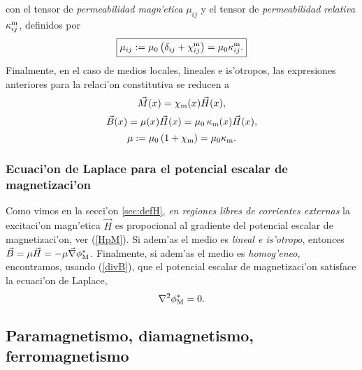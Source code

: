 con el tensor de \textit{permeabilidad magn'etica} $\mu_{ij}$ y el
tensor de \textit{permeabilidad relativa} $\kappa^{\rm m}_{ij}$, definidos por
\begin{equation}
 \boxed{\mu_{ij}:=\mu_0\left(\delta_{ij}+\chi^{\rm
m}_{ij}\right)=\mu_0\kappa^{\rm m}_{ij}.}
\end{equation}
Finalmente, en el caso de medios locales, lineales e is'otropos, las
expresiones anteriores para la relaci'on constitutiva se reducen a
\begin{equation}
 \vec{M}(x)=\chi_{\rm m}(x)\vec{H}(x),
\end{equation}
\begin{equation}
 \vec{B}(x)=\mu(x)\vec{H}(x)=\mu_0\,\kappa_{\rm m}(x)\vec{H}(x),
\end{equation}
\begin{equation}
 \mu:=\mu_0\left(1+\chi_{\rm m}\right)=\mu_0\kappa_{\rm m}.
\end{equation}


\subsubsection{Ecuaci'on de Laplace para el potencial escalar de magnetizaci'on}
Como vimos en la secci'on \ref{sec:defH}, \textit{en regiones libres de corrientes externas} la excitaci'on magn'etica $\vec{H}$ es propocional al gradiente del potencial escalar de magnetizaci'on, ver (\ref{HpM}). Si adem'as el medio es \textit{lineal e is'otropo}, entonces $\vec{B}=\mu\vec{H}=-\mu\vec{\nabla}\phi^\ast_{\rm M}$. Finalmente, si adem'as el medio es \textit{homog'eneo}, encontramos, usando (\ref{divB}), que el potencial escalar de magnetizaci'on satisface la ecuaci'on de Laplace,
\begin{equation}
\nabla^2\phi^\ast_{\rm M}=0.
\end{equation}


\subsection{Paramagnetismo, diamagnetismo, ferromagnetismo}

